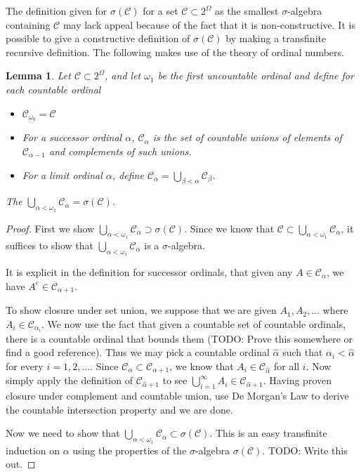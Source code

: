 \documentclass{amsart}
\newtheorem{lem}[thm]{Lemma}
\theoremstyle{remark}
\theoremstyle{definition}
\begin{document}
The definition given for $\sigma(\mathcal{C})$ for a set $\mathcal{C}
\subset 2^\Omega$ as the smallest $\sigma$-algebra containing
$\mathcal{C}$ may lack appeal because of the fact that it is
non-constructive.  It is possible to give a constructive definition of
$\sigma(\mathcal{C})$ by making a transfinite recursive definition.
The following makes use of the theory of ordinal numbers.
\begin{lem}Let $\mathcal{C} \subset 2^\Omega$, and let $\omega_1$ be
  the first uncountable ordinal and define for each countable ordinal
\begin{itemize}
\item[(i)]$\mathcal{C}_{\omega_0} = \mathcal{C}$
\item[(ii)]For a successor ordinal $\alpha$, $\mathcal{C}_\alpha$ is
  the set of countable unions of elements of $\mathcal{C}_{\alpha -
    1}$ and complements of such unions.
\item[(iii)]For a limit ordinal $\alpha$, define $\mathcal{C}_\alpha =
  \bigcup_{\beta < \alpha} \mathcal{C}_\beta$.
\end{itemize}
The $\bigcup_{\alpha < \omega_1} \mathcal{C}_\alpha = \sigma(\mathcal{C})$.
\end{lem}
\begin{proof}
First we show $\bigcup_{\alpha < \omega_1} \mathcal{C}_\alpha \supset
\sigma(\mathcal{C})$.  Since we know that $\mathcal{C} \subset
\bigcup_{\alpha < \omega_1} \mathcal{C}_\alpha$, it suffices to show
that $\bigcup_{\alpha < \omega_1} \mathcal{C}_\alpha$ is a
$\sigma$-algebra.

It is explicit in the definition for successor
ordinals, that given any $A \in \mathcal{C}_\alpha$, we have $A^c \in  \mathcal{C}_{\alpha+1}$.

To show closure under set union, we suppose that we are
given $A_1, A_2, \dots$ where $A_i \in \mathcal{C}_{\alpha_i}$.  We now
use the fact that given a countable set of countable ordinals, there
is a countable ordinal that bounds them (TODO: Prove this somewhere or
find a good reference).  Thus we may pick a countable ordinal $\hat
\alpha$ such that $\alpha_i < \hat {\alpha}$ for every $i=1,2,\dots$.  Since
$\mathcal{C}_\alpha \subset \mathcal{C}_{\alpha+1}$, we know that $A_i
\in \mathcal{C}_{\hat \alpha}$ for all $i$.  Now simply apply the definition
of $\mathcal{C}_{\hat \alpha + 1}$ to see
$\bigcup_{i=1}^\infty A_i \in \mathcal{C}_{\hat \alpha + 1}$.  Having
proven closure under complement and countable union, use De
Morgan's Law to derive the countable intersection property and we are done.

Now we need to show that $\bigcup_{\alpha < \omega_1} \mathcal{C}_\alpha \subset
\sigma(\mathcal{C})$.  This is an easy transfinite induction on
$\alpha$ using the properties of the $\sigma$-algebra
$\sigma(\mathcal{C})$.
TODO: Write this out.
\end{proof}
\end{document}
